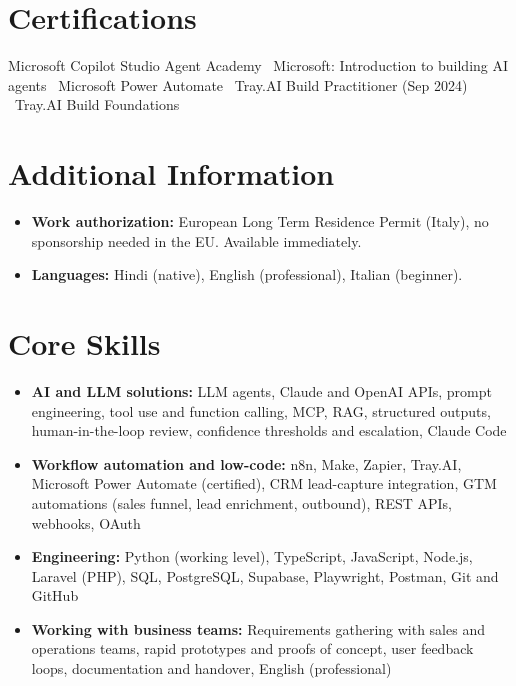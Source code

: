 \documentclass[a4paper,11pt]{article}
\begin{document}
\section{Certifications}
Microsoft Copilot Studio Agent Academy \textbullet\ Microsoft: Introduction to building AI agents \textbullet\ Microsoft Power Automate \textbullet\ Tray.AI Build Practitioner (Sep 2024) \textbullet\ Tray.AI Build Foundations

\section{Additional Information}
\begin{itemize}
 \item \textbf{Work authorization:} European Long Term Residence Permit (Italy), no sponsorship needed in the EU. Available immediately.
 \item \textbf{Languages:} Hindi (native), English (professional), Italian (beginner).
\end{itemize}

\section{Core Skills}
\begin{itemize}
 \item \textbf{AI and LLM solutions:} LLM agents, Claude and OpenAI APIs, prompt engineering, tool use and function calling, MCP, RAG, structured outputs, human-in-the-loop review, confidence thresholds and escalation, Claude Code
 \item \textbf{Workflow automation and low-code:} n8n, Make, Zapier, Tray.AI, Microsoft Power Automate (certified), CRM lead-capture integration, GTM automations (sales funnel, lead enrichment, outbound), REST APIs, webhooks, OAuth
 \item \textbf{Engineering:} Python (working level), TypeScript, JavaScript, Node.js, Laravel (PHP), SQL, PostgreSQL, Supabase, Playwright, Postman, Git and GitHub
 \item \textbf{Working with business teams:} Requirements gathering with sales and operations teams, rapid prototypes and proofs of concept, user feedback loops, documentation and handover, English (professional)
\end{itemize}
\end{document}
